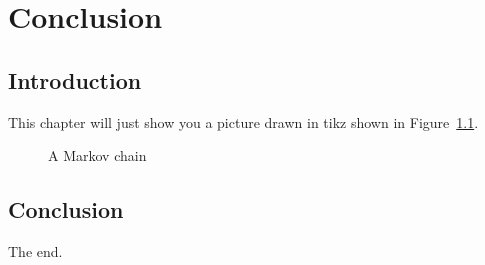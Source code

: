 \chapter{Conclusion}\label{cha:conclusion}

\section{Introduction}

This chapter will just show you a picture drawn in tikz shown in
Figure~\ref{fig:markov_chain}.

\begin{figure}[!hbtp]
    \begin{center}
        
        \caption{A Markov chain}\label{fig:markov_chain}
    \end{center}
\end{figure}

\section{Conclusion}

The end.

\lipsum
